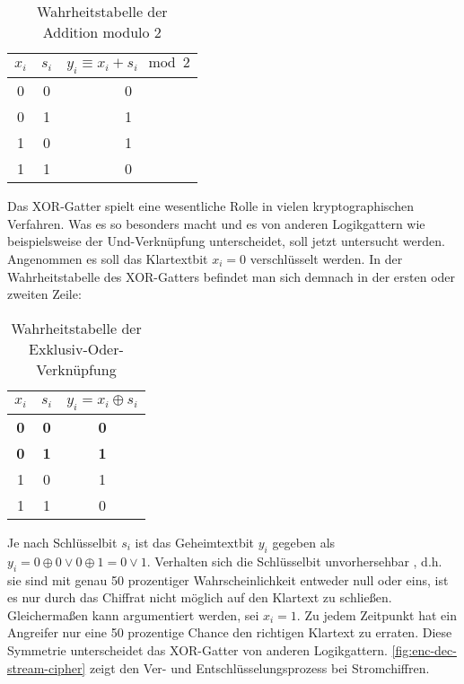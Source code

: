 \begin{table}[h]
  \centering
  \caption{Wahrheitstabelle der Addition modulo 2}
  \begin{tabular}{cc|c}
    $x_i$ & $s_i$ & $y_i \equiv x_i + s_i \mod{2}$ \\ \hline
    0     & 0     & 0                              \\
    0     & 1     & 1                              \\
    1     & 0     & 1                              \\
    1     & 1     & 0                              \\
  \end{tabular}
  \label{tab:truth-table-addition-mod-2}
\end{table}

\noindent
Das XOR-Gatter spielt eine wesentliche Rolle in vielen kryptographischen Verfahren.
Was es so besonders macht und es von anderen Logikgattern
wie beispielsweise der Und-Verknüpfung unterscheidet, soll jetzt untersucht werden.
Angenommen es soll das Klartextbit $x_i = 0$ verschlüsselt werden. In der Wahrheitstabelle
des XOR-Gatters befindet man sich demnach in der ersten oder zweiten Zeile:

\begin{table}[h]
  \centering
  \caption{Wahrheitstabelle der Exklusiv-Oder-Verknüpfung}
  \begin{tabular}{cc|c}
    $x_i$      & $s_i$      & $y_i = x_i \oplus s_i$ \\ \hline
    \textbf{0} & \textbf{0} & \textbf{0}             \\
    \textbf{0} & \textbf{1} & \textbf{1}             \\
    1          & 0          & 1                      \\
    1          & 1          & 0                      \\
  \end{tabular}
  \label{tab:truth-table-xor}
\end{table}

\noindent
Je nach Schlüsselbit $s_i$ ist das Geheimtextbit $y_i$ gegeben als
$y_i = 0 \oplus 0 \vee 0 \oplus 1 = 0 \vee 1$.
Verhalten sich die Schlüsselbit unvorhersehbar , d.h. sie sind mit genau 50 prozentiger
Wahrscheinlichkeit entweder null oder eins, ist es nur durch das Chiffrat nicht möglich auf
den Klartext zu schließen. Gleichermaßen kann argumentiert werden, sei $x_i = 1$.
Zu jedem Zeitpunkt hat ein Angreifer nur eine 50 prozentige Chance den richtigen Klartext zu erraten.
Diese Symmetrie unterscheidet das XOR-Gatter von anderen Logikgattern.
\autoref{fig:enc-dec-stream-cipher} zeigt den Ver- und Entschlüsselungsprozess
bei Stromchiffren.
\newpage

